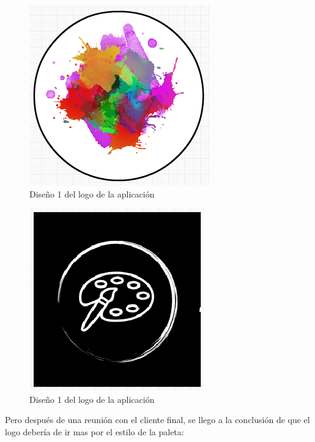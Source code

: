 \begin{multicols}{2}
    \begin{figure}[H]
        \centering
        \includegraphics[scale=0.8]{imagenes/diseno/logo1.png}
        \caption{Diseño 1 del logo de la aplicación}
        \label{fig:logo1}
    \end{figure}
    
    \begin{figure}[H]
        \centering
        \includegraphics[scale=0.8]{imagenes/diseno/logo2.png}
        \caption{Diseño 1 del logo de la aplicación}
        \label{fig:logo2}
    \end{figure}
\end{multicols}

Pero después de una reunión con el cliente final, se llego a la conclusión de que el logo debería de ir mas por el estilo de la paleta:

